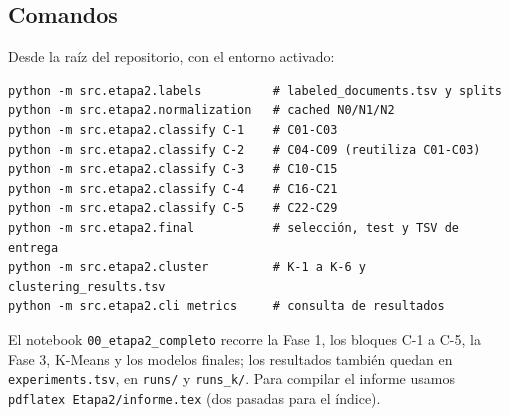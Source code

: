 \documentclass[11pt,a4paper]{article}
\newcommand{\code}[1]{\texttt{#1}}
\begin{document}
\subsection{Comandos}
Desde la raíz del repositorio, con el entorno activado:

\begin{verbatim}
python -m src.etapa2.labels          # labeled_documents.tsv y splits
python -m src.etapa2.normalization   # cached N0/N1/N2
python -m src.etapa2.classify C-1    # C01-C03
python -m src.etapa2.classify C-2    # C04-C09 (reutiliza C01-C03)
python -m src.etapa2.classify C-3    # C10-C15
python -m src.etapa2.classify C-4    # C16-C21
python -m src.etapa2.classify C-5    # C22-C29
python -m src.etapa2.final           # selección, test y TSV de entrega
python -m src.etapa2.cluster         # K-1 a K-6 y clustering_results.tsv
python -m src.etapa2.cli metrics     # consulta de resultados
\end{verbatim}

El notebook \code{00\_etapa2\_completo} recorre la Fase 1, los bloques C-1 a C-5,
la Fase 3, K-Means y los modelos finales; los resultados también quedan en
\code{experiments.tsv}, en \code{runs/} y \code{runs\_k/}. Para compilar el informe usamos
\code{pdflatex Etapa2/informe.tex} (dos pasadas para el índice).
\end{document}
